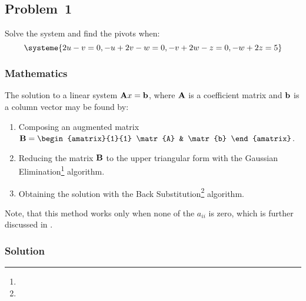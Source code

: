 \subsection{Problem~1}%
\label{problem:1}

Solve the system and find the pivots when:
\begin{equation*}
    \systeme{2u-v=0,-u+2v-w=0,-v+2w-z=0,-w+2z=5}
\end{equation*}

\subsubsection*{Mathematics}
The solution to a linear system $\mathbf{A}x = \mathbf{b}$, where $\mathbf{A}$ is a
coefficient matrix and $\mathbf{b}$ is a column vector may be found by:
\begin{enumerate}
  \item Composing an augmented matrix
    $\matr{B} = \begin{amatrix}{1}{1}
      \matr{A} & \matr{b}
    \end{amatrix}$.
  \item Reducing the matrix $\mathbf{B}$ to the upper triangular form with the Gaussian
    Elimination\footnote{} algorithm.
  \item Obtaining the solution with the Back
    Substitution\footnote{} algorithm.
\end{enumerate}

Note, that this method works only when none of the $a_{ii}$ is zero, which is further
discussed in .

\subsubsection*{Solution}

